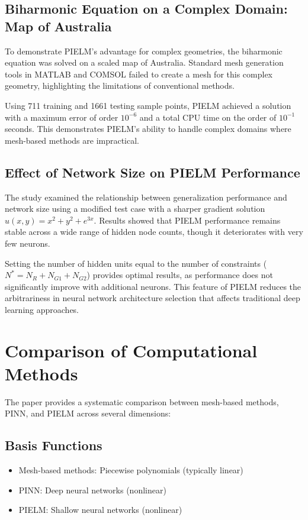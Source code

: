 \documentclass[11pt]{article}
\begin{document}
\subsection{Biharmonic Equation on a Complex Domain: Map of Australia}

To demonstrate PIELM's advantage for complex geometries, the biharmonic equation was solved on a scaled map of Australia. Standard mesh generation tools in MATLAB and COMSOL failed to create a mesh for this complex geometry, highlighting the limitations of conventional methods.

Using 711 training and 1661 testing sample points, PIELM achieved a solution with a maximum error of order $10^{-6}$ and a total CPU time on the order of $10^{-1}$ seconds. This demonstrates PIELM's ability to handle complex domains where mesh-based methods are impractical.

\subsection{Effect of Network Size on PIELM Performance}

The study examined the relationship between generalization performance and network size using a modified test case with a sharper gradient solution $u(x,y) = x^2 + y^2 + e^{3x}$. Results showed that PIELM performance remains stable across a wide range of hidden node counts, though it deteriorates with very few neurons.

Setting the number of hidden units equal to the number of constraints ($N^* = N_R + N_{G1} + N_{G2}$) provides optimal results, as performance does not significantly improve with additional neurons. This feature of PIELM reduces the arbitrariness in neural network architecture selection that affects traditional deep learning approaches.

\section{Comparison of Computational Methods}

The paper provides a systematic comparison between mesh-based methods, PINN, and PIELM across several dimensions:

\subsection{Basis Functions}
\begin{itemize}
    \item Mesh-based methods: Piecewise polynomials (typically linear)
    \item PINN: Deep neural networks (nonlinear)
    \item PIELM: Shallow neural networks (nonlinear)
\end{itemize}
\end{document}
